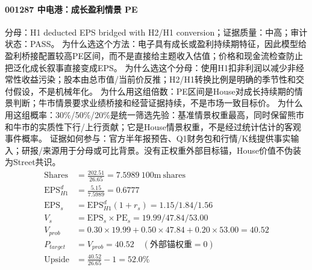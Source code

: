 \paragraph{001287 中电港：成长盈利情景 PE}
分母：H1 deducted EPS bridged with H2/H1 conversion；证据质量：中高；审计状态：PASS。
为什么选这个方法：电子具有成长或盈利持续期特征，因此模型给盈利桥接配置较高PE区间，而不是直接给主题收入估值；价格和现金流检查防止把泛化成长叙事直接变成EPS。
为什么选这个分母：使用H1扣非利润以减少非经常性收益污染；股本由总市值/当前价反推；H2/H1转换比例是明确的季节性和交付假设，不是机械年化。
为什么用这组倍数：PE区间是House对成长持续期的情景判断；牛市情景要求业绩桥接和经营证据持续，不是市场一致目标价。
为什么用这组概率：30\%/50\%/20\%是统一筛选先验：基准情景权重最高，同时保留熊市和牛市的实质性下行/上行贡献；它是House情景权重，不是经过统计估计的客观事件概率。
证据如何参与：官方半年报预告、Q1财务包和行情/K线提供事实输入；研报/来源用于分母或可比背景。没有正权重外部目标锚，House价值不伪装为Street共识。
\begin{align*}
\mathrm{Shares} &= \frac{202.51}{26.65}=7.5989\ \mathrm{100m\ shares}\\
\mathrm{EPS}_{H1}^d &= \frac{5.15}{7.5989}=0.6777\\
\mathrm{EPS}_s &= \mathrm{EPS}_{H1}^d(1+r_s)=1.15/1.84/1.56\\
V_s &= \mathrm{EPS}_s\times \mathrm{PE}_s=19.99/47.84/53.00\\
V_{prob} &= 0.30\times 19.99+0.50\times 47.84+0.20\times 53.00=40.52\\
P_{target} &= V_{prob}=40.52\quad(\text{外部锚权重}=0)\\
\mathrm{Upside} &= \frac{40.52}{26.65}-1=52.0\%\\
\end{align*}

